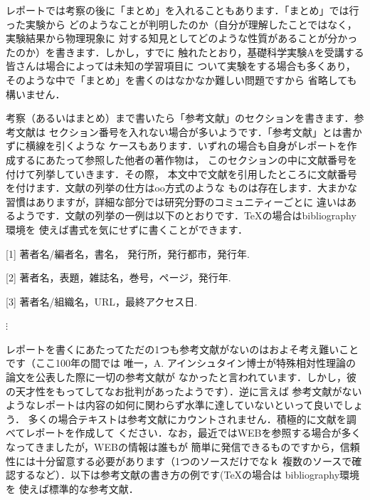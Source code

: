 \documentclass[a4paper,10pt]{jsarticle}
\begin{document}
レポートでは考察の後に「まとめ」を入れることもあります．「まとめ」では行った実験から
どのようなことが判明したのか（自分が理解したことではなく，実験結果から物理現象に
対する知見としてどのような性質があることが分かったのか）を書きます．しかし，すでに
触れたとおり，基礎科学実験Aを受講する皆さんは場合によっては未知の学習項目に
ついて実験をする場合も多くあり，そのような中で「まとめ」を書くのはなかなか難しい問題ですから
省略しても構いません．

\vspace{3mm}
考察（あるいはまとめ）まで書いたら「参考文献」のセクションを書きます．参考文献は
セクション番号を入れない場合が多いようです．「参考文献」とは書かずに横線を引くような
ケースもあります．いずれの場合も自身がレポートを作成するにあたって参照した他者の著作物は，
このセクションの中に文献番号を付けて列挙していきます．その際，
本文中で文献を引用したところに文献番号を付けます．文献の列挙の仕方はoo方式のような
ものは存在します．大まかな習慣はありますが，詳細な部分では研究分野のコミュニティーごとに
違いはあるようです．文献の列挙の一例は以下のとおりです．\TeX の場合はbibliography環境を
使えば書式を気にせずに書くことができます．

\vspace{2mm}
[1] 著者名/編者名，書名， 発行所，発行都市，発行年. 

[2] 著者名，表題，雑誌名，巻号，ページ，発行年.

[3] 著者名/組織名，URL，最終アクセス日.

$\vdots$

\vspace{3mm}
レポートを書くにあたってただの1つも参考文献がないのはおよそ考え難いことです（ここ100年の間では
唯一，A. アインシュタイン博士が特殊相対性理論の論文を公表した際に一切の参考文献が
なかったと言われています．しかし，彼の天才性をもってしてなお批判があったようです）．逆に言えば
参考文献がないようなレポートは内容の如何に関わらず水準に達していないといって良いでしょう．
多くの場合テキストは参考文献にカウントされません．積極的に文献を調べてレポートを作成して
ください．なお，最近ではWEBを参照する場合が多くなってきましたが，WEBの情報は誰もが
簡単に発信できるものですから，信頼性には十分留意する必要があります（1つのソースだけでなｋ
複数のソースで確認するなど）．以下は参考文献の書き方の例です(\TeX の場合は bibliography環境を
使えば標準的な参考文献．
\end{document}
